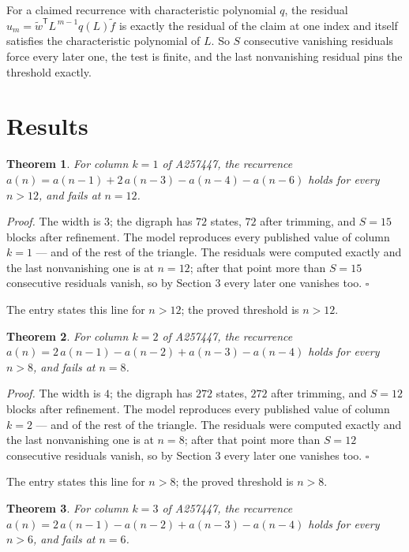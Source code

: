 \documentclass[11pt]{article}
\newtheorem{theorem}{Theorem}
\theoremstyle{definition}
\begin{document}
For a claimed recurrence with characteristic polynomial $q$, the residual $u_m = \tilde w^{\mathsf T}L^{\,m-1}q(L)\tilde f$ is exactly the residual of the claim at one index and itself satisfies the characteristic polynomial of $L$. So $S$ consecutive vanishing residuals force every later one, the test is finite, and the last nonvanishing residual pins the threshold exactly.

\section{Results}

\begin{theorem} For column $k = 1$ of A257447, the recurrence $a(n) = a(n-1) + 2\,a(n-3) - a(n-4) - a(n-6)$ holds for every $n > 12$, and fails at $n = 12$.\end{theorem}

{\itshape Proof.} The width is $3$; the digraph has $72$ states, $72$ after trimming, and $S = 15$ blocks after refinement. The model reproduces every published value of column $k = 1$ --- and of the rest of the triangle. The residuals were computed exactly and the last nonvanishing one is at $n = 12$; after that point more than $S = 15$ consecutive residuals vanish, so by Section 3 every later one vanishes too. $\square$

The entry states this line for $n > 12$; the proved threshold is $n > 12$.

\begin{theorem} For column $k = 2$ of A257447, the recurrence $a(n) = 2\,a(n-1) - a(n-2) + a(n-3) - a(n-4)$ holds for every $n > 8$, and fails at $n = 8$.\end{theorem}

{\itshape Proof.} The width is $4$; the digraph has $272$ states, $272$ after trimming, and $S = 12$ blocks after refinement. The model reproduces every published value of column $k = 2$ --- and of the rest of the triangle. The residuals were computed exactly and the last nonvanishing one is at $n = 8$; after that point more than $S = 12$ consecutive residuals vanish, so by Section 3 every later one vanishes too. $\square$

The entry states this line for $n > 8$; the proved threshold is $n > 8$.

\begin{theorem} For column $k = 3$ of A257447, the recurrence $a(n) = 2\,a(n-1) - a(n-2) + a(n-3) - a(n-4)$ holds for every $n > 6$, and fails at $n = 6$.\end{theorem}
\end{document}
